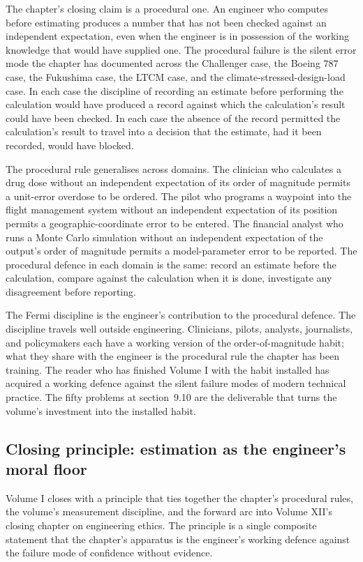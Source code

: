 The chapter's closing claim is a procedural one. An engineer
who computes before estimating produces a number that has not
been checked against an independent expectation, even when the
engineer is in possession of the working knowledge that would
have supplied one. The procedural failure is the silent error
mode the chapter has documented across the Challenger case,
the Boeing $787$ case, the Fukushima case, the LTCM case, and
the climate-stressed-design-load case. In each case the
discipline of recording an estimate before performing the
calculation would have produced a record against which the
calculation's result could have been checked. In each case the
absence of the record permitted the calculation's result to
travel into a decision that the estimate, had it been
recorded, would have blocked.

The procedural rule generalises across domains. The clinician
who calculates a drug dose without an independent
expectation of its order of magnitude permits a unit-error
overdose to be ordered. The pilot who programs a waypoint into
the flight management system without an independent
expectation of its position permits a geographic-coordinate
error to be entered. The financial analyst who runs a Monte
Carlo simulation without an independent expectation of the
output's order of magnitude permits a model-parameter error to
be reported. The procedural defence in each domain is the
same: record an estimate before the calculation, compare
against the calculation when it is done, investigate any
disagreement before reporting.

The Fermi discipline is the engineer's contribution to the
procedural defence. The discipline travels well outside
engineering. Clinicians, pilots, analysts, journalists, and
policymakers each have a working version of the
order-of-magnitude habit; what they share with the engineer is
the procedural rule the chapter has been training. The reader
who has finished Volume I with the habit installed has
acquired a working defence against the silent failure modes of
modern technical practice. The fifty problems at section~9.10
are the deliverable that turns the volume's investment into the
installed habit.

\subsection{Closing principle: estimation as the engineer's moral
floor}

Volume I closes with a principle that ties together the chapter's
procedural rules, the volume's measurement discipline, and the
forward arc into Volume XII's closing chapter on engineering
ethics. The principle is a single composite statement that the
chapter's apparatus is the engineer's working defence against
the failure mode of confidence without evidence.

